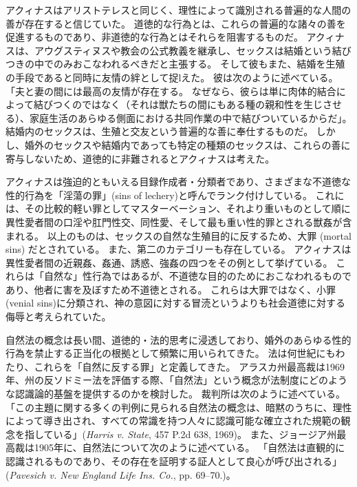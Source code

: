 \documentclass[paper=a4,book,openany]{jlreq}
\begin{document}
アクィナスはアリストテレスと同じく、理性によって識別される普遍的な人間の善が存在すると信じていた。
道徳的な行為とは、これらの普遍的な諸々の善を促進するものであり、非道徳的な行為とはそれらを阻害するものだ。
アクィナスは、アウグスティヌスや教会の公式教義を継承し、セックスは結婚という結びつきの中でのみおこなわれるべきだと主張する。
そして彼もまた、結婚を生殖の手段であると同時に友情の絆として捉lえた。
彼は次のように述べている。
「夫と妻の間には最高の友情が存在する。
なぜなら、彼らは単に肉体的結合によって結びつくのではなく（それは獣たちの間にもある種の親和性を生じさせる）、家庭生活のあらゆる側面における共同作業の中で結びついているからだ」\citep[Bk.3 Pt. 2 Chap. 123]{aquinas55:_summa_gentil}。
結婚内のセックスは、生殖と交友という普遍的な善に奉仕するものだ。
しかし、婚外のセックスや結婚内であっても特定の種類のセックスは、これらの善に寄与しないため、道徳的に非難されるとアクィナスは考えた。

アクィナスは強迫的ともいえる目録作成者・分類者であり、さまざまな不道徳な性的行為を「淫蕩の罪」(sins of lechery)と呼んでランク付けしている。
これには、その比較的軽い罪としてマスターベーション、それより重いものとして順に異性愛者間の口淫や肛門性交、同性愛、そして最も重い性的罪とされる獣姦が含まれる。
以上のものは、セックスの自然な生殖目的に反するため、大罪 (mortal sins) だとされている。
また、第二のカテゴリーも存在している。
アクィナスは異性愛者間の近親姦、姦通、誘惑、強姦の四つをその例として挙げている。
これらは「自然な」性行為ではあるが、不道徳な目的のためにおこなわれるものであり、他者に害を及ぼすため不道徳とされる。
これらは大罪ではなく、小罪(venial sins)に分類され、神の意図に対する冒涜というよりも社会道徳に対する侮辱と考えられていた\citep[cf.][II.ii, Question 154]{aquinas20:_summa_theol}。

自然法の概念は長い間、道徳的・法的思考に浸透しており、婚外のあらゆる性的行為を禁止する正当化の根拠として頻繁に用いられてきた。
法は何世紀にもわたり、これらを「自然に反する罪」と定義してきた。
アラスカ州最高裁は1969年、州の反ソドミー法を評価する際、「自然法」という概念が法制度にどのような認識論的基盤を提供するのかを検討した。
裁判所は次のように述べている。
「この主題に関する多くの判例に見られる自然法の概念は、暗黙のうちに、理性によって導き出され、すべての常識を持つ人々に認識可能な確立された規範の観念を指している」(\emph{Harris v. State}, 457 P.2d 638, 1969)。
また、ジョージア州最高裁は1905年に、自然法について次のように述べている。
「自然法は直観的に認識されるものであり、その存在を証明する証人として良心が呼び出される」(\emph{Pavesich v. New England Life Ins. Co.}, pp. 69--70.)。
\end{document}
